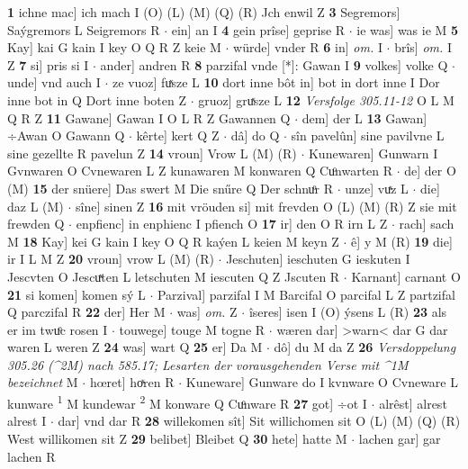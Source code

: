 \documentclass[8pt,a4paper,notitlepage]{article}
\begin{document}
\begin{table}[ht]
\begin{minipage}[t]{0.5\linewidth}
\textbf{1} ichne mac] ich mach I (O) (L) (M) (Q) (R) Jch enwil Z \textbf{3} Segremors] Saýgremors L Seigremors R  $\cdot$ ein] an I \textbf{4} gein prîse] geprise R  $\cdot$ ie was] was ie M \textbf{5} Kay] kai G kain I key O Q R Z keie M  $\cdot$ würde] vnder R \textbf{6} in] \textit{om.} I  $\cdot$ brîs] \textit{om.} I Z \textbf{7} si] pris si I  $\cdot$ ander] andren R \textbf{8} parzifal vnde [*]: Gawan I \textbf{9} volkes] volke Q  $\cdot$ unde] vnd auch I  $\cdot$ ze vuoz] fuͯsze L \textbf{10} dort inne bôt in] bot in dort inne I Dor inne bot in Q Dort inne boten Z  $\cdot$ gruoz] gruͯsze L \textbf{12} \textit{Versfolge 305.11-12} O L M Q R Z  \textbf{11} Gawane] Gawan I O L R Z Gawannen Q  $\cdot$ dem] der L \textbf{13} Gawan] ÷Awan O Gawann Q  $\cdot$ kêrte] kert Q Z  $\cdot$ dâ] do Q  $\cdot$ sîn pavelûn] sine pavilvne L sine gezellte R pavelun Z \textbf{14} vroun] Vrow L (M) (R)  $\cdot$ Kunewaren] Gunwarn I Gvnwaren O Cvnewaren L Z kunawaren M konwaren Q Cuͦnwarten R  $\cdot$ de] der O (M) \textbf{15} der snüere] Das swert M Die snűre Q Der schnuͦr R  $\cdot$ unze] vuͯz L  $\cdot$ die] daz L (M)  $\cdot$ sîne] sinen Z \textbf{16} mit vröuden si] mit frevden O (L) (M) (R) Z sie mit frewden Q  $\cdot$ enpfienc] in enphienc I pfiench O \textbf{17} ir] den O R irn L Z  $\cdot$ rach] sach M \textbf{18} Kay] kei G kain I key O Q R kaýen L keien M keyn Z  $\cdot$ ê] y M (R) \textbf{19} die] ir I L M Z \textbf{20} vroun] vrow L (M) (R)  $\cdot$ Jeschuten] ieschuten G ieskuten I Jescvten O Jescuͯten L letschuten M iescuten Q Z Jscuten R  $\cdot$ Karnant] carnant O \textbf{21} si komen] komen sý L  $\cdot$ Parzival] parzifal I M Barcifal O parcifal L Z partzifal Q parczifal R \textbf{22} der] Her M  $\cdot$ was] \textit{om.} Z  $\cdot$ îseres] isen I (O) ýsens L (R) \textbf{23} als er im twuͦc rosen I  $\cdot$ touwege] touge M togne R  $\cdot$ wæren dar] >warn< dar G dar waren L weren Z \textbf{24} was] wart Q \textbf{25} er] Da M  $\cdot$ dô] du M da Z \textbf{26} \textit{Versdoppelung 305.26 (\textasciicircum2M) nach 585.17; Lesarten der vorausgehenden Verse mit \textasciicircum1M bezeichnet} M   $\cdot$ hœret] hoͯren R  $\cdot$ Kuneware] Gunware do I kvnware O Cvneware L kunware \textsuperscript{1}\hspace{-1.3mm} M kundewar \textsuperscript{2}\hspace{-1.3mm} M konware Q Cuͦnware R \textbf{27} got] ÷ot I  $\cdot$ alrêst] alrest alrest I  $\cdot$ dar] vnd dar R \textbf{28} willekomen sît] Sit willichomen sit O (L) (M) (Q) (R) West willikomen sit Z \textbf{29} belibet] Bleibet Q \textbf{30} hete] hatte M  $\cdot$ lachen gar] gar lachen R \newline

\end{minipage}
\end{table}
\end{document}
